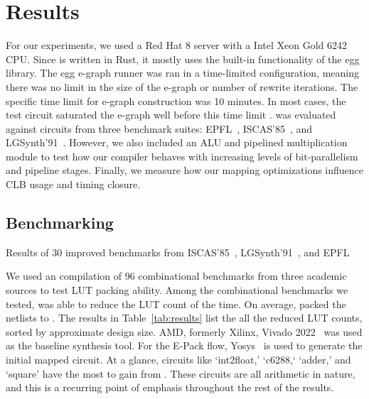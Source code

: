\section{Results}\label{sec:results}
For our experiments, we used a Red Hat 8 server with a Intel Xeon Gold 6242
CPU. Since \shortname{} is written in Rust, it mostly uses the built-in
functionality of the egg library. The egg e-graph runner was ran in a
time-limited configuration, meaning there was no limit in the size of the
e-graph or number of rewrite iterations. The specific time limit for e-graph
construction was 10 minutes. In most cases, the test circuit saturated the
e-graph well before this time limit .
\shortname{} was evaluated against circuits from three benchmark suites:
EPFL~\cite{epflbench}, ISCAS'85~\cite{iscasbench}, and
LGSynth'91~\cite{lgsynthbench}. However, we also included an ALU and pipelined
multiplication module to test how our compiler behaves with increasing levels
of bit-parallelism and pipeline stages. Finally, we measure how our mapping
optimizations influence CLB usage and timing closure.

\subsection{Benchmarking}\label{sec:results:benchmark}
\begin{table}
    \centering
    \caption{Results of 30 improved benchmarks from ISCAS'85~\cite{iscasbench}, LGSynth'91~\cite{lgsynthbench}, and EPFL~\cite{epflbench}}\label{tab:results}
\end{table}

We used an compilation of 96 combinational benchmarks from three academic
sources to test LUT packing ability. Among the combinational benchmarks we
tested, \shortname{} was able to reduce the LUT count \fmetric{} of the time.
On average, \shortname{} packed the netlists to \metric{}. The results in
Table~\ref{tab:results} list the all the reduced LUT counts, sorted by
approximate design size. AMD, formerly Xilinx, Vivado 2022~\cite{vivado} was
used as the baseline synthesis tool. For the E-Pack flow, Yosys~\cite{yosys} is
used to generate the initial mapped circuit. At a glance, circuits like
`int2float,' `c6288,` `adder,' and `square' have the most to gain from
\shortname{}. These circuits are all arithmetic in nature, and this is a
recurring point of emphasis throughout the rest of the results.


